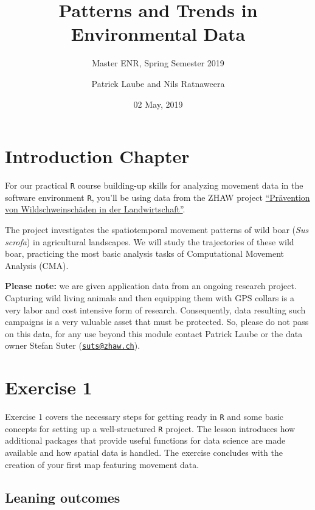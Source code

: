 \documentclass[]{book}
\title{Patterns and Trends in Environmental Data}
\subtitle{Master ENR, Spring Semester 2019}
\author{Patrick Laube and Nils Ratnaweera}
\date{02 May, 2019}
\begin{document}
\maketitle

{
\setcounter{tocdepth}{1}
\tableofcontents
}
\chapter*{Introduction Chapter}\label{introduction-chapter}

For our practical \texttt{R} course building-up skills for analyzing
movement data in the software environment \texttt{R}, you'll be using
data from the ZHAW project
\href{https://www.zhaw.ch/de/lsfm/institute-zentren/iunr/integrative-oekologie/wildtiermanagement/referenzprojekte/}{``Prävention
von Wildschweinschäden in der Landwirtschaft''}.

The project investigates the spatiotemporal movement patterns of wild
boar (\emph{Sus scrofa}) in agricultural landscapes. We will study the
trajectories of these wild boar, practicing the most basic analysis
tasks of Computational Movement Analysis (CMA).

\textbf{Please note:} we are given application data from an ongoing
research project. Capturing wild living animals and then equipping them
with GPS collars is a very labor and cost intensive form of research.
Consequently, data resulting such campaigns is a very valuable asset
that must be protected. So, please do not pass on this data, for any use
beyond this module contact Patrick Laube or the data owner Stefan Suter
(\href{mailto:suts@zhaw.ch}{\nolinkurl{suts@zhaw.ch}}).

\chapter{Exercise 1}\label{exercise-1}

Exercise 1 covers the necessary steps for getting ready in \texttt{R}
and some basic concepts for setting up a well-structured \texttt{R}
project. The lesson introduces how additional packages that provide
useful functions for data science are made available and how spatial
data is handled. The exercise concludes with the creation of your first
map featuring movement data.

\section{Leaning outcomes}\label{leaning-outcomes}
\end{document}
